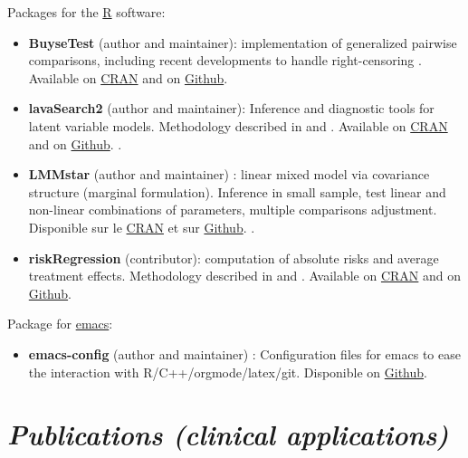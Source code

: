\documentclass[12pt]{article}
\begin{document}
Packages for the \href{https://www.r-project.org/}{R} software:
\begin{itemize}
\item \textbf{BuyseTest} (author and maintainer): implementation of generalized
pairwise comparisons, including recent developments to handle
right-censoring
\citep{peron2016extension,peron2021correcting}. Available on \href{https://cran.r-project.org/web/packages/BuyseTest/index.html}{CRAN} and on
\href{https://github.com/bozenne/BuyseTest}{Github}.

\item \textbf{lavaSearch2} (author and maintainer): Inference and diagnostic
tools for latent variable models.  Methodology described in
\citep{ozenne2020small} and \citep{ozenne2022controlling}. Available on
\href{https://cran.r-project.org/web/packages/lavaSearch2/index.html}{CRAN} and on \href{https://github.com/bozenne/lavaSearch2}{Github}. .

\item \textbf{LMMstar} (author and maintainer) : linear mixed model via
covariance structure (marginal formulation). Inference in small
sample, test linear and non-linear combinations of parameters,
multiple comparisons adjustment. Disponible sur le \href{https://cran.r-project.org/web/packages/LMMstar/index.html}{CRAN} et sur
\href{https://github.com/bozenne/LMMstar}{Github}. .

\item \textbf{riskRegression} (contributor): computation of absolute risks and
average treatment effects. Methodology described in
\citep{ozenne2017riskregression} and
\citep{ozenne2020estimation}. Available on \href{https://cran.r-project.org/web/packages/riskRegression/index.html}{CRAN} and on \href{https://github.com/tagteam/riskRegression}{Github}.
\end{itemize}

\clearpage

Package for \href{https://www.gnu.org/software/emacs/}{emacs}:
\begin{itemize}
\item \textbf{emacs-config} (author and maintainer) : Configuration files for
emacs to ease the interaction with
R/C++/orgmode/latex/git. Disponible on \href{https://github.com/bozenne/emacs-config}{Github}.
\end{itemize}

\pagebreak[3]

\section*{\emph{Publications (clinical applications)}}
\label{sec:org7189838}
\end{document}
